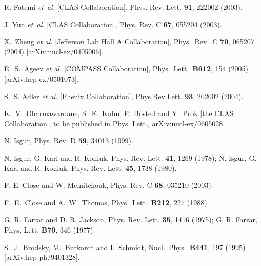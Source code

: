 \documentclass[12pt]{article}
\begin{document}
\begin{thebibliography}{99}
R. Fatemi {\it et~al.} [CLAS Collaboration],
Phys. Rev. Lett. {\bf 91}, 222002 (2003).

J. Yun  {\it et~al.} [CLAS Collaboration],
Phys. Rev. C {\bf 67}, 055204 (2003).

  X.~Zheng {\it et al.}  [Jefferson Lab Hall A Collaboration],
  Phys.\ Rev.\ C {\bf 70}, 065207 (2004)
  [arXiv:nucl-ex/0405006].
%

  E.~S.~Ageev {\it et al.}  [COMPASS Collaboration],
  Phys.\ Lett.\  {\bf B612}, 154 (2005)
  [arXiv:hep-ex/0501073].
  
S.~S. Adler {\it et al.} [Phenix Collaboration],
Phys.Rev.Lett. {\bf 93}, 202002 (2004).

  K.~V.~Dharmawardane, S.~E.~Kuhn, P.~Bosted and Y.~Prok  [the CLAS
                  Collaboration],
  to be published in Phys. Lett., arXiv:nucl-ex/0605028.



 N. Isgur, Phys. Rev. D {\bf 59}, 34013 (1999).
%

 N. Isgur, G. Karl and R. Koniuk, Phys. Rev. Lett. {\bf 41},
1269 (1978); N. Isgur, G. Karl and R. Koniuk, Phys. Rev. Lett. {\bf 45}, 1738
(1980).
%

 F. E. Close and  W. Melnitchouk, Phys. Rev. C {\bf 68},
  035210 (2003).
% 

  F.~E.~Close and A.~W.~Thomas,
  Phys.\ Lett.\  {\bf B212}, 227 (1988).

 G. R. Farrar and D. R. Jackson, Phys. Rev. Lett. {\bf 35}, 
1416 (1975); G. R. Farrar, Phys. Lett.  {\bf B70}, 346 (1977).

  S.~J.~Brodsky, M.~Burkardt and I.~Schmidt,
  Nucl.\ Phys.\  {\bf B441}, 197 (1995)
  [arXiv:hep-ph/9401328].


\end{thebibliography}
\end{document}
